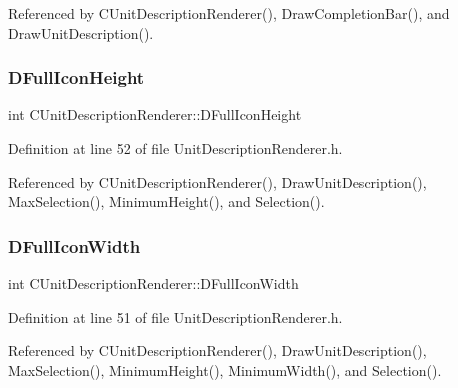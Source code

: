 Referenced by C\+Unit\+Description\+Renderer(), Draw\+Completion\+Bar(), and Draw\+Unit\+Description().

\hypertarget{classCUnitDescriptionRenderer_ae9f7d843d0eabd4b1f1b19bfa5332754}{}\label{classCUnitDescriptionRenderer_ae9f7d843d0eabd4b1f1b19bfa5332754} 
\subsubsection{\texorpdfstring{D\+Full\+Icon\+Height}{DFullIconHeight}}
{\footnotesize\ttfamily int C\+Unit\+Description\+Renderer\+::\+D\+Full\+Icon\+Height\hspace{0.3cm}{\ttfamily [protected]}}



Definition at line 52 of file Unit\+Description\+Renderer.\+h.



Referenced by C\+Unit\+Description\+Renderer(), Draw\+Unit\+Description(), Max\+Selection(), Minimum\+Height(), and Selection().

\hypertarget{classCUnitDescriptionRenderer_a4bd79032fe13b9c09386a24cb8ef7650}{}\label{classCUnitDescriptionRenderer_a4bd79032fe13b9c09386a24cb8ef7650} 
\subsubsection{\texorpdfstring{D\+Full\+Icon\+Width}{DFullIconWidth}}
{\footnotesize\ttfamily int C\+Unit\+Description\+Renderer\+::\+D\+Full\+Icon\+Width\hspace{0.3cm}{\ttfamily [protected]}}



Definition at line 51 of file Unit\+Description\+Renderer.\+h.



Referenced by C\+Unit\+Description\+Renderer(), Draw\+Unit\+Description(), Max\+Selection(), Minimum\+Height(), Minimum\+Width(), and Selection().

\hypertarget{classCUnitDescriptionRenderer_afa1e3591f74862f7640695f0f6125bc7}{}\label{classCUnitDescriptionRenderer_afa1e3591f74862f7640695f0f6125bc7} 
